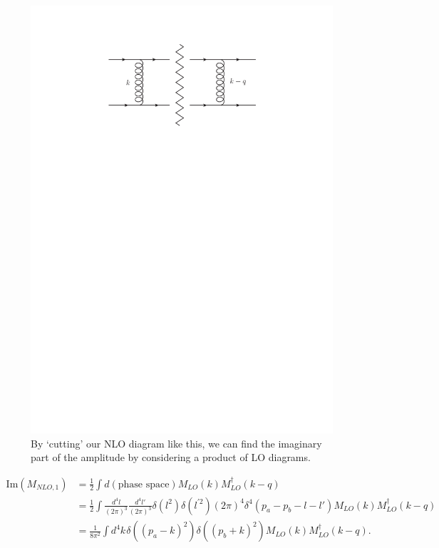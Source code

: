 \begin{figure}[t]
\centering
\includegraphics[scale=1]{Images/cuts.pdf} 
\caption{By `cutting' our NLO diagram like this, we can find the imaginary part of the amplitude by considering a product of LO diagrams. }
\label{fig:cut}
\end{figure}

\begin{equation}
\begin{split}
\text{Im}(M_{NLO,1}) &= \frac{1}{2} \int d(\text{phase space}) M_{LO}(k) M_{LO}^\dagger (k - q) \\
&= \frac{1}{2} \int \frac{d^4 l}{(2 \pi)^3} \frac{d^4 l'}{(2 \pi)^3} \delta(l^2) \delta(l^{'2}) (2 \pi)^4 \delta^4(p_a - p_b - l -l')  M_{LO}(k) M_{LO}^\dagger (k - q) \\
&= \frac{1}{8 \pi^2} \int d^4 k \hspace{1pt} \delta((p_a - k)^2) \delta((p_b+k)^2) M_{LO}(k) M_{LO}^\dagger (k - q).
\end{split}
\end{equation}

